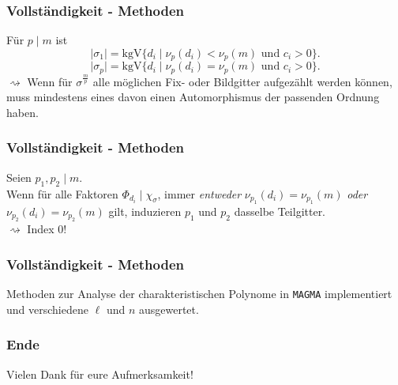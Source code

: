 \documentclass{beamer}
\newcommand{\kgV}{\text{kgV}}
\begin{document}
\begin{frame}[plain]
	\frametitle{Vollständigkeit - Methoden}
	Für $p \mid m$ ist 
	\[\vert \sigma_1 \vert = \kgV \lbrace d_i \mid \nu_p(d_i) < \nu_p(m) \text{ und } c_i > 0 \rbrace.\]
	\[\vert \sigma_p \vert = \kgV \lbrace d_i \mid \nu_p(d_i) = \nu_p(m) \text{ und } c_i > 0 \rbrace.\]
	\pause
	$\rightsquigarrow$ Wenn für $\sigma^\frac{m}{p}$ alle möglichen Fix- oder Bildgitter aufgezählt werden können, muss mindestens eines davon einen Automorphismus der passenden Ordnung haben.
\end{frame}

\begin{frame}[plain]
	\frametitle{Vollständigkeit - Methoden}
	Seien $p_1, p_2 \mid m$.\\
	Wenn für alle Faktoren $\Phi_{d_i} \mid \chi_\sigma$, immer \textit{entweder} $\nu_{p_1}(d_i) = \nu_{p_1}(m)$ \textit{oder} $\nu_{p_2}(d_i) = \nu_{p_2}(m)$ gilt, induzieren $p_1$ und $p_2$ dasselbe Teilgitter.\\
	\pause
	$\rightsquigarrow$ Index $0$!
\end{frame}

\begin{frame}[plain]
	\frametitle{Vollständigkeit - Methoden}
	Methoden zur Analyse der charakteristischen Polynome in \texttt{MAGMA} implementiert und verschiedene $\ell$ und $n$ ausgewertet.\\
\end{frame}

\begin{frame}[plain]
	\frametitle{Ende}
	\begin{large} \begin{center} Vielen Dank für eure Aufmerksamkeit! \end{center} \end{large}
\end{frame}
\end{document}
